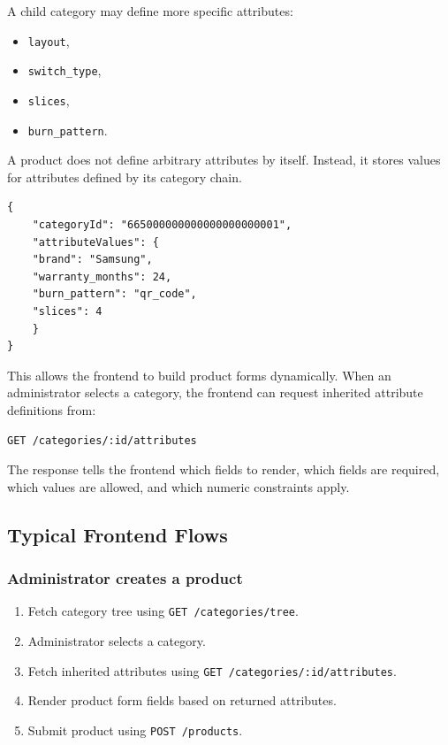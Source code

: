 A child category may define more specific attributes:

\begin{itemize}
    \item \texttt{layout},
    \item \texttt{switch\_type},
    \item \texttt{slices},
    \item \texttt{burn\_pattern}.
\end{itemize}

A product does not define arbitrary attributes by itself. Instead, it stores values for attributes defined by its category chain.

\begin{verbatim}
{
    "categoryId": "665000000000000000000001",
    "attributeValues": {
    "brand": "Samsung",
    "warranty_months": 24,
    "burn_pattern": "qr_code",
    "slices": 4
    }
}
\end{verbatim}

This allows the frontend to build product forms dynamically. When an administrator selects a category, the frontend can request inherited attribute definitions from:

\begin{verbatim}
GET /categories/:id/attributes
\end{verbatim}

The response tells the frontend which fields to render, which fields are required, which values are allowed, and which numeric constraints apply.

\subsection{Typical Frontend Flows}

\subsubsection{Administrator creates a product}

\begin{enumerate}
    \item Fetch category tree using \texttt{GET /categories/tree}.
    \item Administrator selects a category.
    \item Fetch inherited attributes using \texttt{GET /categories/:id/attributes}.
    \item Render product form fields based on returned attributes.
    \item Submit product using \texttt{POST /products}.
\end{enumerate}

